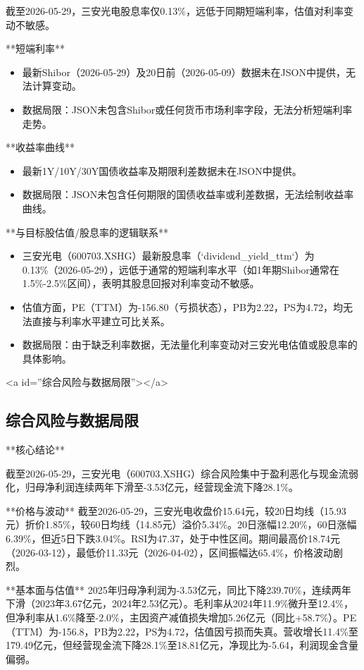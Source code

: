 \documentclass[12pt,a4paper]{article}
\begin{document}
截至2026-05-29，三安光电股息率仅0.13\%，远低于同期短端利率，估值对利率变动不敏感。

**短端利率**
\begin{itemize}
\item 最新Shibor（2026-05-29）及20日前（2026-05-09）数据未在JSON中提供，无法计算变动。
\item 数据局限：JSON未包含Shibor或任何货币市场利率字段，无法分析短端利率走势。
\end{itemize}

**收益率曲线**
\begin{itemize}
\item 最新1Y/10Y/30Y国债收益率及期限利差数据未在JSON中提供。
\item 数据局限：JSON未包含任何期限的国债收益率或利差数据，无法绘制收益率曲线。
\end{itemize}

**与目标股估值/股息率的逻辑联系**
\begin{itemize}
\item 三安光电（600703.XSHG）最新股息率（`dividend\_yield\_ttm`）为0.13\%（2026-05-29），远低于通常的短端利率水平（如1年期Shibor通常在1.5\%-2.5\%区间），表明其股息回报对利率变动不敏感。
\item 估值方面，PE（TTM）为-156.80（亏损状态），PB为2.22，PS为4.72，均无法直接与利率水平建立可比关系。
\item 数据局限：由于缺乏利率数据，无法量化利率变动对三安光电估值或股息率的具体影响。
\end{itemize}

<a id=''综合风险与数据局限''></a>

\subsection{ 综合风险与数据局限}

**核心结论**

截至2026-05-29，三安光电（600703.XSHG）综合风险集中于盈利恶化与现金流弱化，归母净利润连续两年下滑至-3.53亿元，经营现金流下降28.1\%。

**价格与波动**
截至2026-05-29，三安光电收盘价15.64元，较20日均线（15.93元）折价1.85\%，较60日均线（14.85元）溢价5.34\%。20日涨幅12.20\%，60日涨幅6.39\%，但近5日下跌3.04\%。RSI为47.37，处于中性区间。期间最高价18.74元（2026-03-12），最低价11.33元（2026-04-02），区间振幅达65.4\%，价格波动剧烈。

**基本面与估值**
2025年归母净利润为-3.53亿元，同比下降239.70\%，连续两年下滑（2023年3.67亿元，2024年2.53亿元）。毛利率从2024年11.9\%微升至12.4\%，但净利率从1.6\%降至-2.0\%，主因资产减值损失增加5.26亿元（同比+58.7\%）。PE（TTM）为-156.8，PB为2.22，PS为4.72，估值因亏损而失真。营收增长11.4\%至179.49亿元，但经营现金流下降28.1\%至18.81亿元，净现比为-5.64，利润现金含量偏弱。
\end{document}
